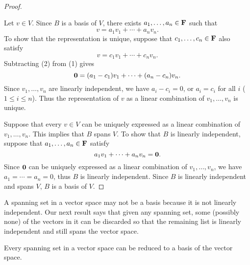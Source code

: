 \begin{proof} \

\fbox{$\implies$} Let $v\in V$. Since $B$ is a basis of $V$, there exists $a_1,\dots,a_n\in\mathbf F$ such that
\begin{equation*}\tag{1}
v=a_1v_1+\cdots+a_nv_n.
\end{equation*}
To show that the representation is unique, suppose that $c_1,\dots,c_n\in\mathbf F$ also satisfy
\begin{equation*}\tag{2}
v=c_1v_1+\cdots+c_nv_n.
\end{equation*}
Subtracting (2) from (1) gives
\[\vb{0}=(a_1-c_1)v_1+\cdots+(a_n-c_n)v_n.\]
Since $v_1,\dots,v_n$ are linearly independent, we have $a_i-c_i=0$, or $a_i=c_i$ for all $i$ ($1\le i\le n$). Thus the representation of $v$ as a linear combination of $v_1,\dots,v_n$ is unique.

\fbox{$\impliedby$} Suppose that every $v\in V$ can be uniquely expressed as a linear combination of $v_1,\dots,v_n$. This implies that $B$ spans $V$. To show that $B$ is linearly independent, suppose that $a_1,\dots,a_n\in\mathbf F$ satisfy
\[a_1v_1+\cdots+a_nv_n=\vb{0}.\]
Since $\vb{0}$ can be uniquely expressed as a linear combination of $v_1,\dots,v_n$, we have $a_1=\cdots=a_n=0$, thus $B$ is linearly independent. Since $B$ is linearly independent and spans $V$, $B$ is a basis of $V$.
\end{proof}

A spanning set in a vector space may not be a basis because it is not linearly independent. Our next result says that given any spanning set, some (possibly none) of the vectors in it can be discarded so that the remaining list is linearly independent and still spans the vector space.

\begin{lemma}\label{lemma:reduce-spanninglist-basis}
Every spanning set in a vector space can be reduced to a basis of the vector space.
\end{lemma}

